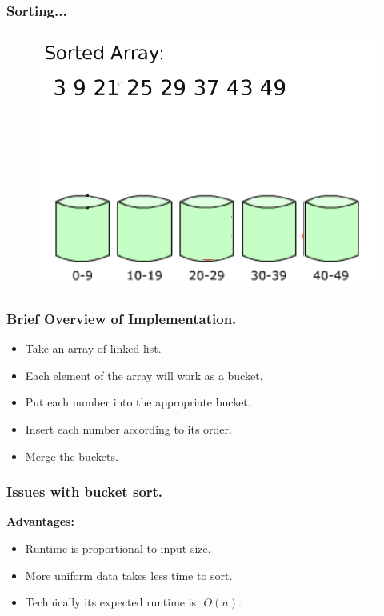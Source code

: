\documentclass[pdf]{beamer}
\begin{document}
\begin{frame}
	\frametitle{Sorting...}
	\begin{figure}
		\includegraphics[scale=.3]{Figure/22.png}
	\end{figure}	
\end{frame}

\begin{frame}
	\frametitle{Brief Overview of Implementation.}
	\begin{itemize}
		\pause
		\item Take an array of linked list.
		\pause	
		\item Each element of the array will work as a bucket.
		\pause		
		\item Put each number into the appropriate bucket.
		\pause		
		\item Insert each number according to its order.
		\pause		
		\item Merge the buckets.
	\end{itemize}
\end{frame}

\begin{frame}
	\frametitle{Issues with bucket sort.}
	\textbf{Advantages:}
	\begin{itemize}
		\pause
		\item Runtime is proportional to input size.
		\pause
		\item More uniform data takes less time to sort.
		\pause
		\item Technically its expected runtime is $  $ $O(n)$.
	\end{itemize}
\end{frame}
\end{document}
